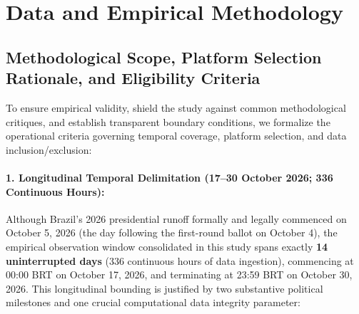 \documentclass[preprint,12pt]{elsarticle}
\begin{document}
\section{Data and Empirical Methodology}\label{sec:methodology}

\subsection{Methodological Scope, Platform Selection Rationale, and Eligibility Criteria}

To ensure empirical validity, shield the study against common methodological critiques, and establish transparent boundary conditions, we formalize the operational criteria governing temporal coverage, platform selection, and data inclusion/exclusion:

\paragraph{1. Longitudinal Temporal Delimitation (17--30 October 2026; 336 Continuous Hours):}
Although Brazil's 2026 presidential runoff formally and legally commenced on October 5, 2026 (the day following the first-round ballot on October 4), the empirical observation window consolidated in this study spans exactly \textbf{14 uninterrupted days} (336 continuous hours of data ingestion), commencing at 00:00 BRT on October 17, 2026, and terminating at 23:59 BRT on October 30, 2026. This longitudinal bounding is justified by two substantive political milestones and one crucial computational data integrity parameter:
\end{document}
